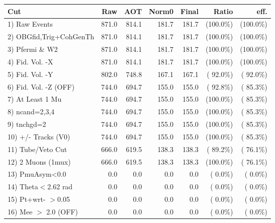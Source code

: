  \begin{table}[h!]\centering
 \begin{tabular}{||l||r|r|r|r|r|r||}
 \hline
 \hline
 Cut & Raw & AOT & Norm0 & Final & Ratio & eff.       \\
 \hline
  1) Raw Events           &        871.0 &        814.1 &        181.7 &        181.7 & (100.0\%) & (100.0\%) \\
  2) OBGfid,Trig+CohGenTh &        871.0 &        814.1 &        181.7 &        181.7 & (100.0\%) & (100.0\%) \\
  3) Pfermi \& W2         &        871.0 &        814.1 &        181.7 &        181.7 & (100.0\%) & (100.0\%) \\
  4) Fid. Vol. -X         &        871.0 &        814.1 &        181.7 &        181.7 & (100.0\%) & (100.0\%) \\
  5) Fid. Vol. -Y         &        802.0 &        748.8 &        167.1 &        167.1 & ( 92.0\%) & ( 92.0\%) \\
  6) Fid. Vol. -Z (OFF)   &        744.0 &        694.7 &        155.0 &        155.0 & ( 92.8\%) & ( 85.3\%) \\
  7) At Least 1 Mu        &        744.0 &        694.7 &        155.0 &        155.0 & (100.0\%) & ( 85.3\%) \\
  8) ncand=2,3,4          &        744.0 &        694.7 &        155.0 &        155.0 & (100.0\%) & ( 85.3\%) \\
  9) tnchgd=2             &        744.0 &        694.7 &        155.0 &        155.0 & (100.0\%) & ( 85.3\%) \\
 10) +/- Tracks (V0)      &        744.0 &        694.7 &        155.0 &        155.0 & (100.0\%) & ( 85.3\%) \\
 11) Tube/Veto Cut        &        666.0 &        619.5 &        138.3 &        138.3 & ( 89.2\%) & ( 76.1\%) \\
 12) 2 Muons (1mux)       &        666.0 &        619.5 &        138.3 &        138.3 & (100.0\%) & ( 76.1\%) \\
 13) PmuAsym<0.0          &          0.0 &          0.0 &          0.0 &          0.0 & (  0.0\%) & (  0.0\%) \\
 14) Theta$<$2.62 rad     &          0.0 &          0.0 &          0.0 &          0.0 & (  0.0\%) & (  0.0\%) \\
 15) Pt+wrt- $>$0.05      &          0.0 &          0.0 &          0.0 &          0.0 & (  0.0\%) & (  0.0\%) \\
 16) Mee $>$ 2.0  (OFF)   &          0.0 &          0.0 &          0.0 &          0.0 & (  0.0\%) & (  0.0\%) \\

\end{tabular}
\end{table}
